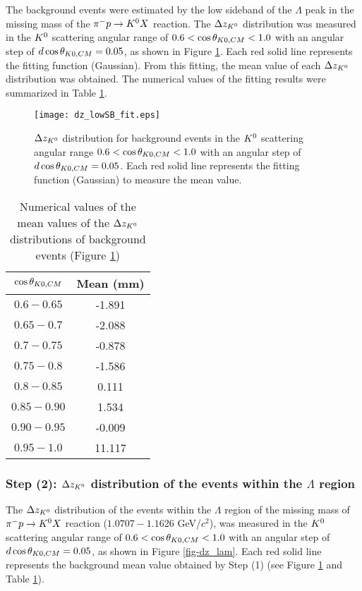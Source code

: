 The background events were estimated by the low sideband of the $\Lambda$ peak in the missing mass of the $\pi^- p \to K^0 X$ reaction. The $\Delta z_{K^{0}}$ distribution was measured in the $K^{0}$ scattering angular range of $0.6<\cos{\theta_{K0,CM}}<1.0$ with an angular step of $d\cos{\theta_{K0,CM}}=0.05$, as shown in Figure \ref{fig-dz_lowSB_fit}. Each red solid line represents the fitting function (Gaussian). From this fitting, the mean value of each $\Delta z_{K^{0}}$ distribution was obtained. The numerical values of the fitting results were summarized in Table \ref{tab-dz_lowSB_fit}. 

\begin{figure}[h]
  \centering
  \texttt{[image: dz\_lowSB\_fit.eps]}
  \caption{$\Delta z_{K^{0}}$ distribution for background events in the $K^{0}$ scattering angular range $0.6<\cos{\theta_{K0,CM}}<1.0$ with an angular step of $d\cos{\theta_{K0,CM}}=0.05$. Each red solid line represents the fitting function (Gaussian) to measure the mean value.}
  \label{fig-dz_lowSB_fit}
\end{figure}

\begin{table}[!h] 
  \begin{center}
  \caption{Numerical values of the mean values of the $\Delta z_{K^{0}}$ distributions of background events (Figure \ref{fig-dz_lowSB_fit})}
  \centering
  \begin{threeparttable}
    \begin{tabular}{cc}
    $\cos{\theta_{K0,CM}}$ & Mean (mm) \\
    \midrule\midrule
    $0.6-0.65$ & -1.891 \\
    \midrule
    $0.65-0.7$ & -2.088 \\
    \midrule
    $0.7-0.75$ & -0.878 \\
    \midrule
    $0.75-0.8$ & -1.586 \\
    \midrule
    $0.8-0.85$ & 0.111 \\
    \midrule
    $0.85-0.90$ & 1.534 \\
    \midrule
    $0.90-0.95$ & -0.009 \\
    \midrule
    $0.95-1.0$ & 11.117 \\
    \end{tabular}
  \end{threeparttable}
  \label{tab-dz_lowSB_fit}
  \end{center}
\end{table}

\subsubsection{Step (2): $\Delta z_{K^{0}}$ distribution of the events within the $\Lambda$ region}
The $\Delta z_{K^{0}}$ distribution of the events within the $\Lambda$ region of the missing mass of $\pi^- p \to K^0 X$ reaction ($1.0707-1.1626$ GeV/$c^{2}$), was measured in the $K^{0}$ scattering angular range of $0.6<\cos{\theta_{K0,CM}}<1.0$ with an angular step of $d\cos{\theta_{K0,CM}}=0.05$, as shown in Figure \ref{fig-dz_lam}. Each red solid line represents the background mean value obtained by Step (1) (see Figure \ref{fig-dz_lowSB_fit} and Table \ref{tab-dz_lowSB_fit}). 

